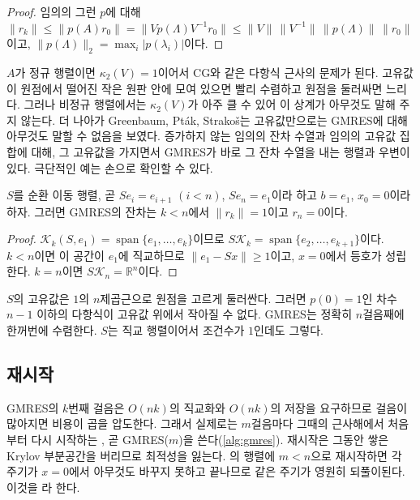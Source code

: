 \begin{proof}
임의의 그런 $p$에 대해 $\|r_k\|\le\|p(A)r_0\|=\|Vp(\Lambda)V^{-1}r_0\|\le\|V\|\,\|V^{-1}\|\,\|p(\Lambda)\|\,\|r_0\|$이고, $\|p(\Lambda)\|_2=\max_i|p(\lambda_i)|$이다.
\end{proof}

$A$가 정규 행렬이면 $\kappa_2(V)=1$이어서 CG와 같은 다항식 근사의 문제가 된다. 고유값이 원점에서 떨어진 작은 원판 안에 모여 있으면 빨리 수렴하고 원점을 둘러싸면 느리다. 그러나 비정규 행렬에서는 $\kappa_2(V)$가 아주 클 수 있어 이 상계가 아무것도 말해 주지 않는다. 더 나아가 Greenbaum, Pták, Strakoš는 고유값만으로는 GMRES에 대해 아무것도 말할 수 없음을 보였다. 증가하지 않는 임의의 잔차 수열과 임의의 고유값 집합에 대해, 그 고유값을 가지면서 GMRES가 바로 그 잔차 수열을 내는 행렬과 우변이 있다\cite{greenbaum1996any}. 극단적인 예는 손으로 확인할 수 있다.

\begin{proposition}
\label{prop:gmres-shift}
$S$를 순환 이동 행렬, 곧 $Se_i=e_{i+1}$ $(i<n)$, $Se_n=e_1$이라 하고 $b=e_1$, $x_0=0$이라 하자. 그러면 GMRES의 잔차는 $k<n$에서 $\|r_k\|=1$이고 $r_n=0$이다.
\end{proposition}

\begin{proof}
$\mathcal K_k(S,e_1)=\operatorname{span}\{e_1,\dots,e_k\}$이므로 $S\mathcal K_k=\operatorname{span}\{e_2,\dots,e_{k+1}\}$이다. $k<n$이면 이 공간이 $e_1$에 직교하므로 $\|e_1-Sx\|\ge1$이고, $x=0$에서 등호가 성립한다. $k=n$이면 $S\mathcal K_n=\mathbb R^n$이다.
\end{proof}

$S$의 고유값은 $1$의 $n$제곱근으로 원점을 고르게 둘러싼다. 그러면 $p(0)=1$인 차수 $n-1$ 이하의 다항식이 고유값 위에서 작아질 수 없다. GMRES는 정확히 $n$걸음째에 한꺼번에 수렴한다. $S$는 직교 행렬이어서 조건수가 $1$인데도 그렇다.

\subsection{재시작}

GMRES의 $k$번째 걸음은 $O(nk)$의 직교화와 $O(nk)$의 저장을 요구하므로 걸음이 많아지면 비용이 곱을 압도한다. 그래서 실제로는 $m$걸음마다 그때의 근사해에서 처음부터 다시 시작하는 , 곧 GMRES($m$)을 쓴다(\cref{alg:gmres}). 재시작은 그동안 쌓은 Krylov 부분공간을 버리므로 최적성을 잃는다. 의 행렬에 $m<n$으로 재시작하면 각 주기가 $x=0$에서 아무것도 바꾸지 못하고 끝나므로 같은 주기가 영원히 되풀이된다. 이것을 라 한다.


